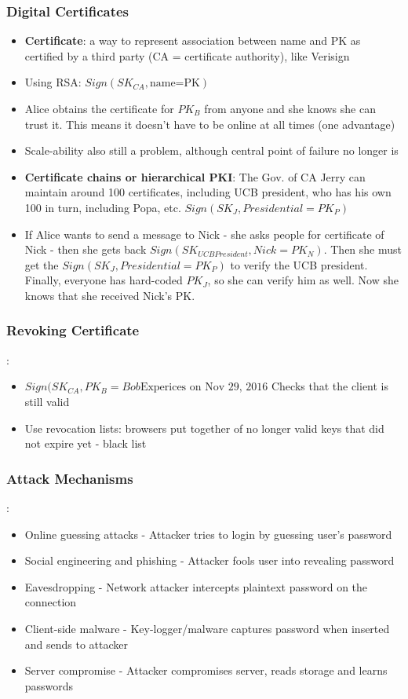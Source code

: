 \documentclass{article}
\begin{document}
\subsubsection{Digital Certificates}
\begin{itemize}
\item \textbf{Certificate}: a way to represent association between name and PK as certified by a third party (CA = certificate authority), like Verisign
\item Using RSA: $Sign(SK_{CA},\textrm{name=PK})$
\item Alice obtains the certificate for $PK_B$ from anyone and she knows she can trust it. This means it doesn't have to be online at all times (one advantage)
\item Scale-ability also still a problem, although central point of failure no longer is
\item \textbf{Certificate chains or hierarchical PKI}: The Gov. of CA Jerry can maintain around 100 certificates, including UCB president, who has his own 100 in turn, including Popa, etc. $Sign(SK_J, Presidential=PK_P)$
\item If Alice wants to send a message to Nick - she asks people for certificate of Nick - then she gets back $Sign(SK_{UCB President}, Nick=PK_N)$. Then she must get the $Sign(SK_J, Presidential=PK_P)$ to verify the UCB president. Finally, everyone has hard-coded $PK_J$, so she can verify him as well. Now she knows that she received Nick's PK.
\end{itemize}

\subsubsection{Revoking Certificate}: 
\begin{itemize}
\item $Sign(SK_{CA}, PK_B=Bob\textrm{Experices on Nov 29, 2016}$ Checks that the client is still valid
\item Use revocation lists: browsers put together of no longer valid keys that did not expire yet - black list
\end{itemize}

\subsubsection{Attack Mechanisms}:
\begin{itemize}
\item Online guessing attacks - Attacker tries to login by guessing user’s password
\item Social engineering and phishing - Attacker fools user into revealing password
\item Eavesdropping - Network attacker intercepts plaintext password on the
connection
\item Client-side malware - Key-logger/malware captures password when
inserted and sends to attacker
\item Server compromise - Attacker compromises server, reads storage and learns passwords
\end{itemize}
\end{document}
